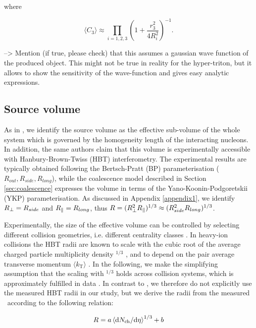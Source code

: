 \documentclass[a4paper,11pt]{scrartcl} %
\begin{document}
 where
 
 \begin{equation}
\langle C_{3} \rangle \approx \prod_{i=1,2,3} \left(1 + \frac{r_{3}^2}{4R_{i}^2} \right)^{-1}.
\label{eq:C3}
\end{equation}
 
 --> Mention (if true, please check) that this assumes a gaussian wave function of the produced object. This might not be true in reality for the hyper-triton, but it allows to show the sensitivity of the wave-function and gives easy analytic expressions.

\subsection{Source volume}
\label{SecSourceVolume}
As in \cite{Scheibl:1998tk}, we identify the source volume as the effective sub-volume of the whole system which is governed by the homogeneity length of the interacting nucleons. In addition, the same authors claim that this volume is experimentally accessible with Hanbury-Brown-Twiss (HBT) interferometry. 
The experimental results are typically obtained following the Bertsch-Pratt (BP) parameterisation ($R_{out}, R_{side}, R_{long}$), while the coalescence model described in Section \ref{sec:coalescence} expresses the volume in terms of the Yano-Koonin-Podgoretskii (YKP) parameterisation. As discussed in Appendix \ref{appendix1}, we identify $R_{\perp} = R_{side}$ and $R_{\|} = R_{long}$, thus $R = (R_{\perp}^{2}R_{\|})^{1/3} \approx (R_{side}^{2}R_{long})^{1/3}$.

Experimentally, the size of the effective volume can be controlled by selecting different collision geometries, i.e. different centrality classes \cite{Abelev:2013qoq}. In heavy-ion collisions the HBT radii are known to scale with the cubic root of the average charged particle multiplicity density \avdNdeta$^{1/3}$ \cite{Adam:2015vna}, and to depend on the pair average transverse momentum $\langle k_{\mathrm{T}}\rangle$ \cite{Aamodt:2011mr}. In the following, we make the simplifying assumption that the scaling with \avdNdeta$^{1/3}$ holds across collision systems, which is approximately fulfilled in data \cite{Adam:2015pya}. In contrast to \cite{Blum:2017qnn}, we therefore do not explicitly use the measured HBT radii in our study, but we derive the radii from the measured \avdNdeta~according to the following relation:

\begin{equation}
R = a \left<\mathrm{d}N_\mathrm{ch}/\mathrm{d}\eta\right>^{1/3} + b
\label{eq:radiusParameterisation}
\end{equation}
\end{document}
